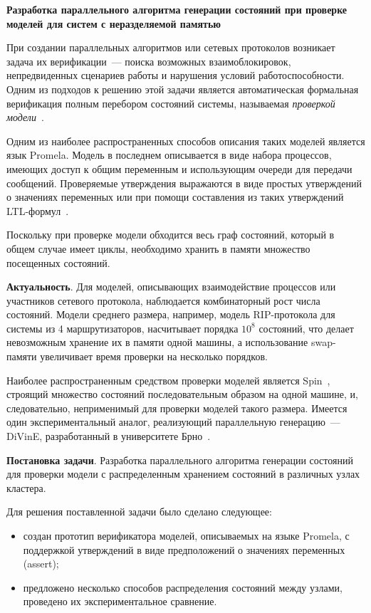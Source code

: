 \documentclass[12pt,a4paper,notitlepage]{article}
\begin{document}
\begin{center}\large \bfseries Разработка параллельного алгоритма генерации состояний при
  проверке моделей для систем с неразделяемой памятью \end{center}

При создании параллельных алгоритмов или сетевых протоколов возникает задача их
верификации~--- поиска возможных взаимоблокировок, непредвиденных сценариев работы и
нарушения условий работоспособности. Одним из подходов к решению этой задачи является
автоматическая формальная верификация полным перебором состояний системы, называемая
\emph{проверкой модели}~\cite{Clarke}.

Одним из наиболее распространенных способов описания таких моделей является язык
Promela. Модель в последнем описывается в виде набора процессов, имеющих доступ к общим
переменным и использующим очереди для передачи сообщений. Проверяемые утверждения
выражаются в виде простых утверждений о значениях переменных или при помощи составления из
таких утверждений LTL-формул~\cite{Clarke}.

Поскольку при проверке модели обходится весь граф состояний, который в общем случае имеет
циклы, необходимо хранить в памяти множество посещенных состояний.

\textbf{Актуальность}. Для моделей, описывающих взаимодействие процессов или участников
сетевого протокола, наблюдается комбинаторный рост числа состояний. Модели среднего
размера, например, модель RIP-протокола для системы из 4 маршрутизаторов, насчитывает
порядка $10^{8}$ состояний, что делает невозможным хранение их в памяти одной машины, а
использование swap-памяти увеличивает время проверки на несколько порядков.

Наиболее распространенным средством проверки моделей является Spin~\cite{SPIN}, строящий
множество состояний последовательным образом на одной машине, и, следовательно,
неприменимый для проверки моделей такого размера. Имеется один экспериментальный аналог,
реализующий параллельную генерацию~--- DiVinE, разработанный в университете
Брно~\cite{DLTL2}.

\textbf{Постановка задачи}. Разработка параллельного алгоритма генерации состояний для
проверки модели с распределенным хранением состояний в различных узлах кластера.

Для решения поставленной задачи было сделано следующее: 

\begin{itemize}
\item создан прототип верификатора моделей, описываемых на языке Promela, с поддержкой
  утверждений в виде предположений о значениях переменных (assert);
\item предложено несколько способов распределения состояний между узлами, проведено их
  экспериментальное сравнение.
\end{itemize}
\end{document}
